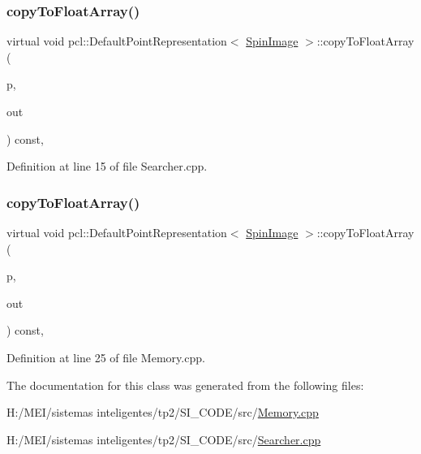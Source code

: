 \subsubsection{\texorpdfstring{copy\+To\+Float\+Array()}{copyToFloatArray()}\hspace{0.1cm}{\footnotesize\ttfamily [1/2]}}
{\footnotesize\ttfamily virtual void pcl\+::\+Default\+Point\+Representation$<$ \hyperlink{include_8h_ab79ade12a22a8e5e2864650f820e9c6f}{Spin\+Image} $>$\+::copy\+To\+Float\+Array (\begin{DoxyParamCaption}\item[{const \hyperlink{include_8h_ab79ade12a22a8e5e2864650f820e9c6f}{Spin\+Image} \&}]{p,  }\item[{float $\ast$}]{out }\end{DoxyParamCaption}) const\hspace{0.3cm}{\ttfamily [inline]}, {\ttfamily [virtual]}}



Definition at line 15 of file Searcher.\+cpp.

\mbox{\label{classpcl_1_1_default_point_representation_3_01_spin_image_01_4_af51ac110bddbb250714b11d268c6ea73}} 
\subsubsection{\texorpdfstring{copy\+To\+Float\+Array()}{copyToFloatArray()}\hspace{0.1cm}{\footnotesize\ttfamily [2/2]}}
{\footnotesize\ttfamily virtual void pcl\+::\+Default\+Point\+Representation$<$ \hyperlink{include_8h_ab79ade12a22a8e5e2864650f820e9c6f}{Spin\+Image} $>$\+::copy\+To\+Float\+Array (\begin{DoxyParamCaption}\item[{const \hyperlink{include_8h_ab79ade12a22a8e5e2864650f820e9c6f}{Spin\+Image} \&}]{p,  }\item[{float $\ast$}]{out }\end{DoxyParamCaption}) const\hspace{0.3cm}{\ttfamily [inline]}, {\ttfamily [virtual]}}



Definition at line 25 of file Memory.\+cpp.



The documentation for this class was generated from the following files\+:\begin{DoxyCompactItemize}
\item 
H\+:/\+M\+E\+I/sistemas inteligentes/tp2/\+S\+I\+\_\+\+C\+O\+D\+E/src/\hyperlink{_memory_8cpp}{Memory.\+cpp}\item 
H\+:/\+M\+E\+I/sistemas inteligentes/tp2/\+S\+I\+\_\+\+C\+O\+D\+E/src/\hyperlink{_searcher_8cpp}{Searcher.\+cpp}\end{DoxyCompactItemize}
